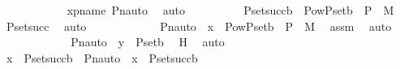 \begin{isabellebody}
\ \ \ \ \ \ \ \ \ \ \isamarkupfalse%
\ xpname\ Pn{\isacharunderscore}{\kern0pt}auto\ \isamarkupfalse%
\ auto\isanewline
\isanewline
\ \ \ \ \ \ \ \ \isamarkupfalse%
\ {\isachardoublequoteopen}P{\isacharunderscore}{\kern0pt}set{\isacharparenleft}{\kern0pt}succ{\isacharparenleft}{\kern0pt}b{\isacharparenright}{\kern0pt}{\isacharparenright}{\kern0pt}\ {\isacharequal}{\kern0pt}\ Pow{\isacharparenleft}{\kern0pt}P{\isacharunderscore}{\kern0pt}set{\isacharparenleft}{\kern0pt}b{\isacharparenright}{\kern0pt}\ {\isasymtimes}\ P{\isacharparenright}{\kern0pt}\ {\isasyminter}\ M{\isachardoublequoteclose}\ \isamarkupfalse%
\ P{\isacharunderscore}{\kern0pt}set{\isacharunderscore}{\kern0pt}succ\ \isamarkupfalse%
\ auto\ \isanewline
\ \ \ \ \ \ \ \ \isamarkupfalse%
\ \isamarkupfalse%
\ {\isachardoublequoteopen}Pn{\isacharunderscore}{\kern0pt}auto{\isacharparenleft}{\kern0pt}{\isasympi}{\isacharparenright}{\kern0pt}\ {\isacharbackquote}{\kern0pt}\ x\ {\isasymin}\ Pow{\isacharparenleft}{\kern0pt}P{\isacharunderscore}{\kern0pt}set{\isacharparenleft}{\kern0pt}b{\isacharparenright}{\kern0pt}\ {\isasymtimes}\ P{\isacharparenright}{\kern0pt}\ {\isasyminter}\ M{\isachardoublequoteclose}\ \isamarkupfalse%
\ assm\ \isamarkupfalse%
\ auto\ \isanewline
\ \ \ \ \ \ \ \ \isamarkupfalse%
\ \isamarkupfalse%
\ {\isachardoublequoteopen}\ Pn{\isacharunderscore}{\kern0pt}auto{\isacharparenleft}{\kern0pt}{\isasympi}{\isacharparenright}{\kern0pt}\ {\isacharbackquote}{\kern0pt}\ y\ {\isasymin}\ P{\isacharunderscore}{\kern0pt}set{\isacharparenleft}{\kern0pt}b{\isacharparenright}{\kern0pt}{\isachardoublequoteclose}\ \isamarkupfalse%
\ H\ \isamarkupfalse%
\ auto\ \isanewline
\ \ \ \ \ \ \isamarkupfalse%
\isanewline
\ \ \ \ \isamarkupfalse%
\isanewline
\ \ \ \ \isamarkupfalse%
\ \isamarkupfalse%
\ {\isachardoublequoteopen}x\ {\isasymin}\ P{\isacharunderscore}{\kern0pt}set{\isacharparenleft}{\kern0pt}succ{\isacharparenleft}{\kern0pt}b{\isacharparenright}{\kern0pt}{\isacharparenright}{\kern0pt}\ {\isasymlongleftrightarrow}\ Pn{\isacharunderscore}{\kern0pt}auto{\isacharparenleft}{\kern0pt}{\isasympi}{\isacharparenright}{\kern0pt}\ {\isacharbackquote}{\kern0pt}\ x\ {\isasymin}\ P{\isacharunderscore}{\kern0pt}set{\isacharparenleft}{\kern0pt}succ{\isacharparenleft}{\kern0pt}b{\isacharparenright}{\kern0pt}{\isacharparenright}{\kern0pt}{\isachardoublequoteclose}\ \isamarkupfalse%

\end{isabellebody}
